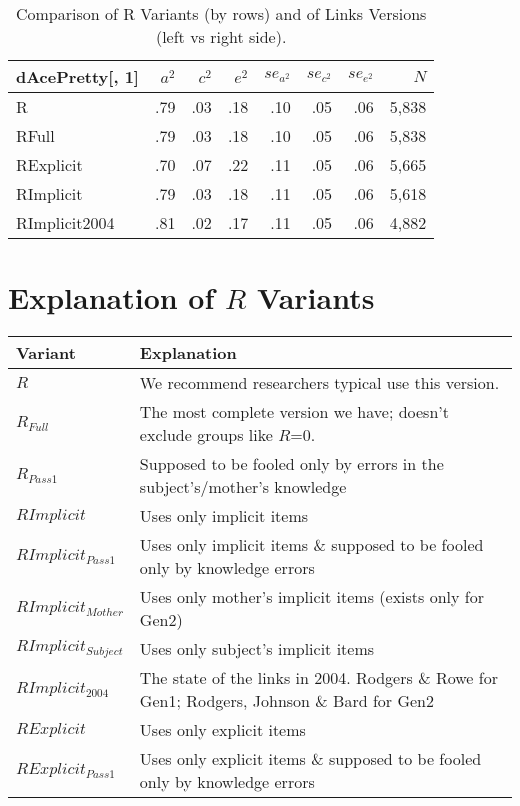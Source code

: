 \documentclass{article}\usepackage[]{graphicx}\usepackage[]{color}
\begin{document}
\begin{table}[ht]
\centering
{\large
\begin{tabular}{l|rrr|rrr|r}
  \hline
dAcePretty[, 1] & $a^2$ & $c^2$ & $e^2$ & $se_{a^2}$ & $se_{c^2}$ & $se_{e^2}$ & $N$ \\ 
  \hline
R & .79 & .03 & .18 & .10 & .05 & .06 & 5,838 \\ 
  RFull & .79 & .03 & .18 & .10 & .05 & .06 & 5,838 \\ 
  RExplicit & .70 & .07 & .22 & .11 & .05 & .06 & 5,665 \\ 
  RImplicit & .79 & .03 & .18 & .11 & .05 & .06 & 5,618 \\ 
  RImplicit2004 & .81 & .02 & .17 & .11 & .05 & .06 & 4,882 \\ 
   \hline
\end{tabular}
}
\caption{Comparison of R Variants (by rows) and of Links Versions (left vs right side).} 
\end{table}


\section{Explanation of $R$ Variants}
\begin{tabular}{l l}
\textbf{Variant} & \textbf{Explanation} \\
\hline
$R$ & We recommend researchers typical use this version. \\
$R_{Full}$ & The most complete version we have; doesn't exclude groups like $R$=0. \\
$R_{Pass1}$ & Supposed to be fooled only by errors in the subject's/mother's knowledge \\
\hline
$RImplicit$ & Uses only implicit items \\
$RImplicit_{Pass1}$ & Uses only implicit items \& supposed to be fooled only by knowledge errors \\
$RImplicit_{Mother}$ & Uses only mother's implicit items (exists only for Gen2)\\
$RImplicit_{Subject}$ & Uses only subject's implicit items\\
$RImplicit_{2004}$ & The state of the links in 2004.  Rodgers \& Rowe for Gen1; Rodgers, Johnson \& Bard for Gen2 \\
\hline
$RExplicit$ & Uses only explicit items \\
$RExplicit_{Pass1}$ & Uses only explicit items \& supposed to be fooled only by knowledge errors \\

\hline
\end{tabular}
\end{document}

